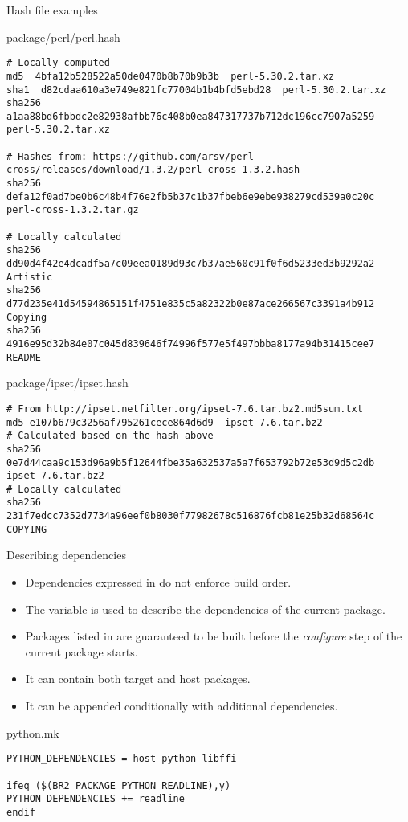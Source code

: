 \begin{frame}[fragile]{Hash file examples}
  \begin{block}{package/perl/perl.hash}
    {\tiny
\begin{verbatim}
# Locally computed
md5  4bfa12b528522a50de0470b8b70b9b3b  perl-5.30.2.tar.xz
sha1  d82cdaa610a3e749e821fc77004b1b4bfd5ebd28  perl-5.30.2.tar.xz
sha256  a1aa88bd6fbbdc2e82938afbb76c408b0ea847317737b712dc196cc7907a5259  perl-5.30.2.tar.xz

# Hashes from: https://github.com/arsv/perl-cross/releases/download/1.3.2/perl-cross-1.3.2.hash
sha256  defa12f0ad7be0b6c48b4f76e2fb5b37c1b37fbeb6e9ebe938279cd539a0c20c  perl-cross-1.3.2.tar.gz

# Locally calculated
sha256  dd90d4f42e4dcadf5a7c09eea0189d93c7b37ae560c91f0f6d5233ed3b9292a2  Artistic
sha256  d77d235e41d54594865151f4751e835c5a82322b0e87ace266567c3391a4b912  Copying
sha256  4916e95d32b84e07c045d839646f74996f577e5f497bbba8177a94b31415cee7  README
\end{verbatim}
    }
  \end{block}

  \begin{block}{package/ipset/ipset.hash}
    {\tiny
\begin{verbatim}
# From http://ipset.netfilter.org/ipset-7.6.tar.bz2.md5sum.txt
md5 e107b679c3256af795261cece864d6d9  ipset-7.6.tar.bz2
# Calculated based on the hash above
sha256 0e7d44caa9c153d96a9b5f12644fbe35a632537a5a7f653792b72e53d9d5c2db  ipset-7.6.tar.bz2
# Locally calculated
sha256 231f7edcc7352d7734a96eef0b8030f77982678c516876fcb81e25b32d68564c  COPYING
\end{verbatim}
    }
  \end{block}
\end{frame}

\begin{frame}[fragile]{Describing dependencies}
  \begin{itemize}
  \item Dependencies expressed in  do not enforce
    build order.
  \item The  variable is used to describe the
    dependencies of the current package.
  \item Packages listed in  are guaranteed to
    be built before the {\em configure} step of the current package
    starts.
  \item It can contain both target and host packages.
  \item It can be appended conditionally with additional dependencies.
  \end{itemize}

  \begin{block}{python.mk}
    \begin{verbatim}
PYTHON_DEPENDENCIES = host-python libffi

ifeq ($(BR2_PACKAGE_PYTHON_READLINE),y)
PYTHON_DEPENDENCIES += readline
endif
    \end{verbatim}
  \end{block}
\end{frame}

